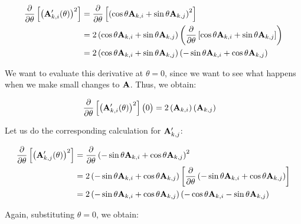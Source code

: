 \documentclass[11pt, oneside]{amsart}
\begin{document}
\begin{equation*}
  \begin{split}
    \frac{\partial }{\partial \theta} \left[ \left( \mathbf{A}'_{k, i}(\theta) \right)^2 \right]
      ={}& \frac{\partial }{\partial \theta} \left[\left(
          \cos\theta \mathbf{A}_{k, i} + \sin\theta \mathbf{A}_{k, j}
        \right)^2\right] \\
      ={}& 2 \left(
          \cos\theta \mathbf{A}_{k, i} + \sin\theta \mathbf{A}_{k, j}
        \right) \left( \frac{\partial }{\partial \theta} \left[
          \cos\theta \mathbf{A}_{k, i} + \sin\theta \mathbf{A}_{k, j}
        \right] \right) \\
      ={}& 2 \left(
        \cos\theta \mathbf{A}_{k, i} + \sin\theta \mathbf{A}_{k, j}
      \right) \left(
        -\sin\theta \mathbf{A}_{k, i} + \cos\theta \mathbf{A}_{k, j}
      \right)
  \end{split}
\end{equation*}

We want to evaluate this derivative at $\theta = 0$, since we want to
see what happens when we make small changes to $\mathbf{A}$. Thus, we obtain:

\begin{equation*}
  \begin{split}
    \frac{\partial }{\partial \theta} \left[ \left( \mathbf{A}'_{k, i}(\theta) \right)^2 \right] \big(0\big)
      ={}&
        2
        \left( \mathbf{A}_{k, i} \right)
        \left( \mathbf{A}_{k, j} \right)
  \end{split}
\end{equation*}

Let us do the corresponding calculation for $\mathbf{A}'_{k, j}$:

\begin{equation*}
  \begin{split}
    \frac{\partial }{\partial \theta} \left[ \left( \mathbf{A}'_{k, j}(\theta) \right)^2 \right]
      ={}& \frac{\partial }{\partial \theta} \left(
          -\sin\theta \mathbf{A}_{k, i} + \cos\theta \mathbf{A}_{k, j}
        \right)^2 \\
      ={}& 2 \left(
          -\sin\theta \mathbf{A}_{k, i} + \cos\theta \mathbf{A}_{k, j}
        \right) \left[ \frac{\partial }{\partial \theta} \left(
          -\sin\theta \mathbf{A}_{k, i} + \cos\theta \mathbf{A}_{k, j}
        \right) \right] \\
      ={}& 2 \left(
        -\sin\theta \mathbf{A}_{k, i} + \cos\theta \mathbf{A}_{k, j}
      \right) \left(
        -\cos\theta \mathbf{A}_{k, i} - \sin\theta \mathbf{A}_{k, j}
      \right)
  \end{split}
\end{equation*}

Again, substituting $\theta = 0$, we obtain:
\end{document}

